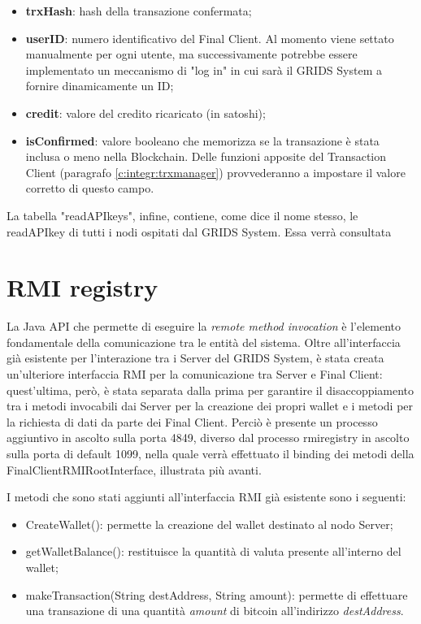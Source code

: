 \begin{itemize}
    \item \textbf{trxHash}: hash della transazione confermata;
	\item \textbf{userID}: numero identificativo del Final Client. Al momento viene settato manualmente per ogni utente, ma successivamente potrebbe essere implementato un meccanismo di "log in" in cui sarà il GRIDS System a fornire dinamicamente un ID;
	\item \textbf{credit}: valore del credito ricaricato (in satoshi);
	\item \textbf{isConfirmed}: valore booleano che memorizza se la transazione è stata inclusa o meno nella Blockchain. Delle funzioni apposite del Transaction Client (paragrafo \ref{c:integr:trxmanager}) provvederanno a impostare il valore corretto di questo campo.
\end{itemize}

La tabella "readAPIkeys", infine, contiene, come dice il nome stesso, le readAPIkey di tutti i nodi ospitati dal GRIDS System. Essa verrà consultata 

\section{RMI registry}
\label{c:integr:rmi}

La Java API che permette di eseguire la \textit{remote method invocation} è l'elemento fondamentale della comunicazione tra le entità del sistema. Oltre all'interfaccia già esistente per l'interazione tra i Server del GRIDS System, è stata creata un'ulteriore interfaccia RMI per la comunicazione tra Server e Final Client: quest'ultima, però, è stata separata dalla prima per garantire il disaccoppiamento tra i metodi invocabili dai Server per la creazione dei propri wallet e i metodi per la richiesta di dati da parte dei Final Client. Perciò è presente un processo aggiuntivo in ascolto sulla porta 4849, diverso dal processo rmiregistry in ascolto sulla porta di default 1099, nella quale verrà effettuato il binding dei metodi della FinalClientRMIRootInterface, illustrata più avanti.

I metodi che sono stati aggiunti all'interfaccia RMI già esistente sono i seguenti:

\begin{itemize}
    \item CreateWallet(): permette la creazione del wallet destinato al nodo Server;
    \item getWalletBalance(): restituisce la quantità di valuta presente all'interno del wallet;
    \item makeTransaction(String destAddress, String amount): permette di effettuare una transazione di una quantità \textit{amount} di bitcoin all'indirizzo \textit{destAddress}.
\end{itemize}


